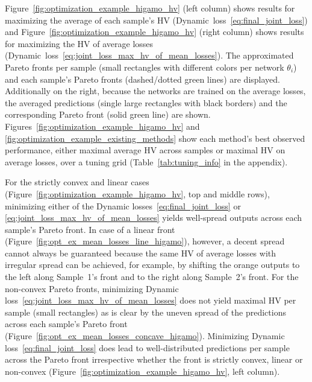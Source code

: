 Figure~\ref{fig:optimization_example_higamo_hv} (left column) shows results for maximizing the average of each sample's HV (Dynamic~loss~\eqref{eq:final_joint_loss}) and Figure~\ref{fig:optimization_example_higamo_hv} (right column) shows results for maximizing the HV of average losses (Dynamic~loss~\eqref{eq:joint_loss_max_hv_of_mean_losses}). The approximated Pareto fronts per sample (small rectangles with different colors per network $\theta_{i}$) and each sample's Pareto fronts (dashed/dotted green lines) are displayed. Additionally on the right, because the networks are trained on the average losses, the averaged predictions (single large rectangles with black borders) and the corresponding Pareto front (solid green line) are shown. 
Figures~\ref{fig:optimization_example_higamo_hv} and \ref{fig:optimization_example_existing_methods} show each method's best observed performance, either maximal average HV across samples or maximal HV on average losses, over a tuning grid (Table~\ref{tab:tuning_info} in the appendix).
  
For the strictly convex and linear cases (Figure~\ref{fig:optimization_example_higamo_hv}, top and middle rows), minimizing either of the Dynamic losses~\eqref{eq:final_joint_loss} or \eqref{eq:joint_loss_max_hv_of_mean_losses} yields well-spread outputs across each sample's Pareto front. In case of a linear front (Figure~\ref{fig:opt_ex_mean_losses_line_higamo}), however, a decent spread cannot always be guaranteed because the same HV of average losses with irregular spread can be achieved, for example, by shifting the orange outputs to the left along Sample~1's front and to the right along Sample~2's front.
For the non-convex Pareto fronts, minimizing Dynamic loss~\eqref{eq:joint_loss_max_hv_of_mean_losses} does not yield maximal HV per sample (small rectangles) as is clear by the uneven spread of the predictions across each sample's Pareto front (Figure~\ref{fig:opt_ex_mean_losses_concave_higamo}). Minimizing Dynamic loss~\eqref{eq:final_joint_loss} does lead to well-distributed predictions per sample across the Pareto front irrespective whether the front is strictly convex, linear or non-convex (Figure~\ref{fig:optimization_example_higamo_hv}, left column).

